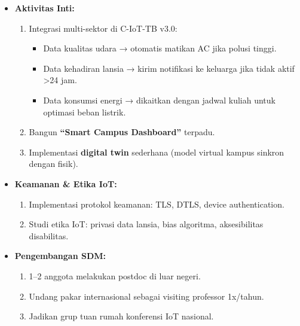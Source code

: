 \documentclass[11pt,a4paper]{article}
\begin{document}
\begin{itemize}
    \item \textbf{Aktivitas Inti:}
          \begin{enumerate}
              \item Integrasi multi-sektor di C-IoT-TB v3.0:
                    \begin{itemize}
                        \item Data kualitas udara → otomatis matikan AC jika polusi tinggi.
                        \item Data kehadiran lansia → kirim notifikasi ke keluarga jika tidak aktif >24 jam.
                        \item Data konsumsi energi → dikaitkan dengan jadwal kuliah untuk optimasi beban listrik.
                    \end{itemize}
              \item Bangun \textbf{“Smart Campus Dashboard”} terpadu.
              \item Implementasi \textbf{digital twin} sederhana (model virtual kampus sinkron dengan fisik).
          \end{enumerate}

    \item \textbf{Keamanan \& Etika IoT:}
          \begin{enumerate}
              \item Implementasi protokol keamanan: TLS, DTLS, device authentication.
              \item Studi etika IoT: privasi data lansia, bias algoritma, aksesibilitas disabilitas.
          \end{enumerate}

    \item \textbf{Pengembangan SDM:}
          \begin{enumerate}
              \item 1–2 anggota melakukan postdoc di luar negeri.
              \item Undang pakar internasional sebagai visiting professor 1x/tahun.
              \item Jadikan grup tuan rumah konferensi IoT nasional.
          \end{enumerate}
\end{itemize}
\end{document}
